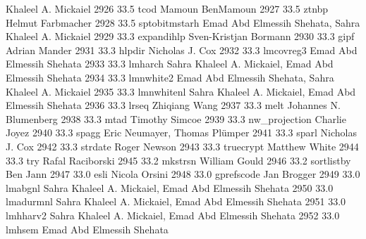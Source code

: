                                    Khaleel A. Mickaiel                     
  2926     33.5    tcod          Mamoun BenMamoun                        
  2927     33.5    ztnbp         Helmut Farbmacher                       
  2928     33.5    sptobitmstarh  Emad Abd Elmessih Shehata, Sahra        
                                   Khaleel A. Mickaiel                     
  2929     33.3    expandihlp    Sven-Kristjan Bormann                   
  2930     33.3    gipf          Adrian Mander                           
  2931     33.3    hlpdir        Nicholas J. Cox                         
  2932     33.3    lmcovreg3     Emad Abd Elmessih Shehata               
  2933     33.3    lmharch       Sahra Khaleel A. Mickaiel, Emad Abd     
                                   Elmessih Shehata                        
  2934     33.3    lmnwhite2     Emad Abd Elmessih Shehata, Sahra        
                                   Khaleel A. Mickaiel                     
  2935     33.3    lmnwhitenl    Sahra Khaleel A. Mickaiel, Emad Abd     
                                   Elmessih Shehata                        
  2936     33.3    lrseq         Zhiqiang Wang                           
  2937     33.3    melt          Johannes N. Blumenberg                  
  2938     33.3    mtad          Timothy Simcoe                          
  2939     33.3    nw_projection  Charlie Joyez                           
  2940     33.3    spagg         Eric Neumayer, Thomas Plümper          
  2941     33.3    sparl         Nicholas J. Cox                         
  2942     33.3    strdate       Roger Newson                            
  2943     33.3    truecrypt     Matthew White                           
  2944     33.3    try           Rafal Raciborski                        
  2945     33.2    mkstrsn       William Gould                           
  2946     33.2    sortlistby    Ben Jann                                
  2947     33.0    esli          Nicola Orsini                           
  2948     33.0    gprefscode    Jan Brogger                             
  2949     33.0    lmabgnl       Sahra Khaleel A. Mickaiel, Emad Abd     
                                   Elmessih Shehata                        
  2950     33.0    lmadurmnl     Sahra Khaleel A. Mickaiel, Emad Abd     
                                   Elmessih Shehata                        
  2951     33.0    lmhharv2      Sahra Khaleel A. Mickaiel, Emad Abd     
                                   Elmessih Shehata                        
  2952     33.0    lmhsem        Emad Abd Elmessih Shehata               
